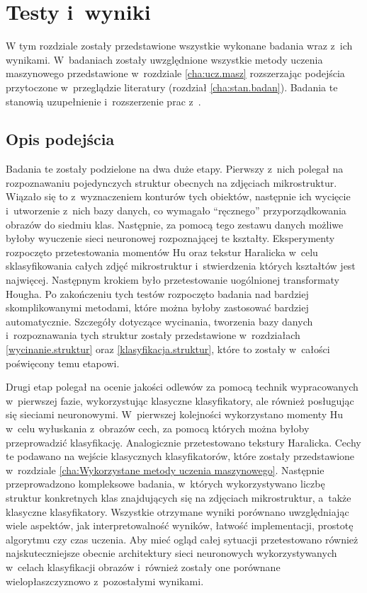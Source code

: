 \chapter{Testy i~wyniki}
\label{cha5}

W tym rozdziale zostały przedstawione wszystkie wykonane badania wraz z~ich wynikami. W~badaniach zostały uwzględnione wszystkie metody uczenia maszynowego przedstawione w~rozdziale \ref{cha:ucz.masz} rozszerzając podejścia przytoczone w~przeglądzie literatury (rozdział \ref{cha:stan.badan}). Badania te stanowią uzupełnienie i~rozszerzenie prac z~\cite{Reczek21}. 

\section{Opis podejścia}
\label{opis_podejścia}
Badania te zostały podzielone na dwa duże etapy. Pierwszy z~nich polegał na rozpoznawaniu pojedynczych struktur obecnych na zdjęciach mikrostruktur. Wiązało się to z~wyznaczeniem konturów tych obiektów, następnie ich wycięcie i~utworzenie z~nich bazy danych, co wymagało “ręcznego” przyporządkowania obrazów do siedmiu klas. Następnie, za pomocą tego zestawu danych możliwe byłoby wyuczenie sieci neuronowej rozpoznającej te kształty. Eksperymenty rozpoczęto przetestowania momentów Hu oraz tekstur Haralicka w~celu sklasyfikowania całych zdjęć mikrostruktur i~stwierdzenia których kształtów jest najwięcej. Następnym krokiem było przetestowanie uogólnionej transformaty Hougha. Po zakończeniu tych testów rozpoczęto badania nad bardziej skomplikowanymi metodami, które można byłoby zastosować bardziej automatycznie. Szczegóły dotyczące wycinania, tworzenia bazy danych i~rozpoznawania tych struktur zostały przedstawione w~rozdziałach \ref{wycinanie.struktur} oraz \ref{klasyfikacja.struktur}, które to zostały w~całości poświęcony temu etapowi.

Drugi etap polegał na ocenie jakości odlewów za pomocą technik wypracowanych w~pierwszej fazie, wykorzystując klasyczne klasyfikatory, ale również posługując się sieciami neuronowymi. W~pierwszej kolejności wykorzystano momenty Hu w~celu wyłuskania z~obrazów cech, za pomocą których można byłoby przeprowadzić klasyfikację. Analogicznie przetestowano tekstury Haralicka. Cechy te podawano na wejście klasycznych klasyfikatorów, które zostały przedstawione w~rozdziale \ref{cha:Wykorzystane metody uczenia maszynowego}. Następnie przeprowadzono kompleksowe badania, w~których wykorzystywano liczbę struktur konkretnych klas znajdujących się na zdjęciach mikrostruktur, a~także klasyczne klasyfikatory. Wszystkie otrzymane wyniki porównano uwzględniając wiele aspektów, jak interpretowalność wyników, łatwość implementacji, prostotę algorytmu czy czas uczenia. Aby mieć ogląd całej sytuacji przetestowano również najskuteczniejsze obecnie architektury sieci neuronowych wykorzystywanych w~celach klasyfikacji obrazów i~również zostały one porównane wielopłaszczyznowo z~pozostałymi wynikami.


